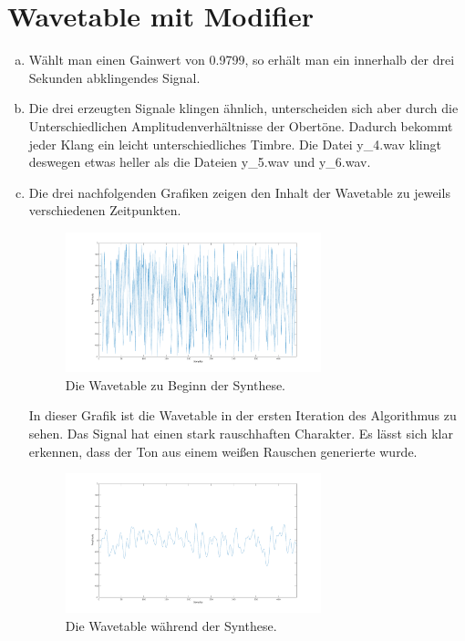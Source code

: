 \chapter{Wavetable mit Modifier}


\begin{enumerate}[a)]
\item
Wählt man einen Gainwert von 0.9799, so erhält man ein innerhalb der drei Sekunden abklingendes Signal.

\item
Die drei erzeugten Signale klingen ähnlich, unterscheiden sich aber durch die Unterschiedlichen Amplitudenverhältnisse der Obertöne. Dadurch bekommt jeder Klang ein leicht unterschiedliches Timbre. Die Datei y\_4.wav klingt deswegen etwas heller als die Dateien y\_5.wav und y\_6.wav.

\item
Die drei nachfolgenden Grafiken zeigen den Inhalt der Wavetable zu jeweils verschiedenen Zeitpunkten.

\begin{figure}[H]
    \center
    \includegraphics[width = 0.7\textwidth]{Figures/Anfang.pdf}
    \caption{Die Wavetable zu Beginn der Synthese.}
    \label{fig:bs1}
\end{figure}

In dieser Grafik ist die Wavetable in der ersten Iteration des Algorithmus zu sehen.
Das Signal hat einen stark rauschhaften Charakter.
Es lässt sich klar erkennen, dass der Ton aus einem weißen Rauschen generierte wurde. 

\begin{figure}[H]
    \center
    \includegraphics[width = 0.7\textwidth]{Figures/Mitte.pdf}
    \caption{Die Wavetable während der Synthese.}
    \label{fig:bs1}
\end{figure}


\end{enumerate}
